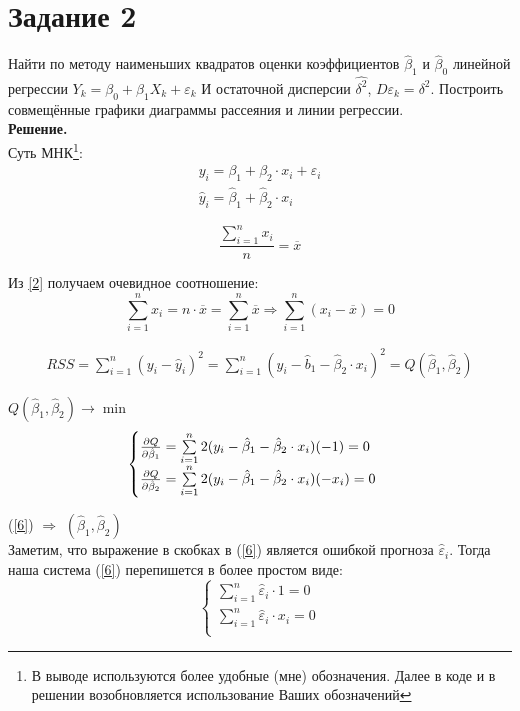 \documentclass[14pt,a4paper]{scrartcl}
\begin{document}
\section*{Задание 2}
Найти по методу наименьших квадратов оценки коэффициентов $\hat \beta_1$ и $\hat \beta_0$ линейной регрессии $Y_k = \beta_0 + \beta_1X_k + \varepsilon_k$ И остаточной дисперсии $\hat{\delta^2}$, $D\varepsilon_k = \delta^2$. Построить совмещённые графики диаграммы рассеяния и линии регрессии.\\
\textbf{Решение.}\\
Суть МНК\footnote{В выводе используются более удобные (мне) обозначения. Далее в коде и в решении возобновляется использование Ваших обозначений}:
\begin{align}
	y_i = \beta_1 + \beta_2 \cdot x_i + \varepsilon_i\label{1}\\
	 \hat y_i = \hat \beta_1 + \hat \beta_2 \cdot x_i\label{2}
\end{align}

\begin{equation}\label{3}
	\frac{\sum\limits_{i=1}^{n}x_i}{n} = \overline{x}
\end{equation}

Из \ref{2} получаем очевидное соотношение:
\begin{equation}\label{4}
	\sum\limits_{i=1}^{n}x_i = n \cdot \overline{x} = \sum\limits_{i=1}^{n} \overline{x} \Longrightarrow \sum\limits_{i=1}^{n}(x_i - \overline{x}) = 0
\end{equation}


\begin{align}\label{5}
	RSS = \sum\limits_{i=1}^{n} (y_i - \hat y_i)^2 = \sum\limits_{i=1}^{n} (y_i-\hat b_1 - \hat \beta_2\cdot x_i)^2 = Q(\hat \beta_1,\hat \beta_2)
\end{align}

$Q(\hat \beta_1,\hat \beta_2) \longrightarrow \min$
\begin{equation}\label{6}
\begin{cases} 
	\pdv{Q}{\hat \beta_1} = \sum\limits_{i=1}^{n}2(y_i - \hat \beta_1 - \hat \beta_2\cdot x_i)(-1) = 0 \\
	\pdv{Q}{\hat \beta_2} = \sum\limits_{i=1}^{n}2(y_i - \hat \beta_1 - \hat \beta_2\cdot x_i)(-x_i) = 0 \\ 
\end{cases}
\end{equation}

(\ref{6}) $\Longrightarrow$ $(\hat \beta_1,\hat \beta_2)$\\
Заметим, что выражение в скобках в (\ref{6}) является ошибкой прогноза $\hat \varepsilon_i$. Тогда наша система (\ref{6}) перепишется в более простом виде:
\begin{equation}\label{7}
\begin{cases} 
	\sum\limits_{i=1}^{n}\hat \varepsilon_i \cdot 1 = 0 \\
	\sum\limits_{i=1}^{n}\hat \varepsilon_i \cdot x_i = 0 \\ 
\end{cases}	
\end{equation}
\end{document}
